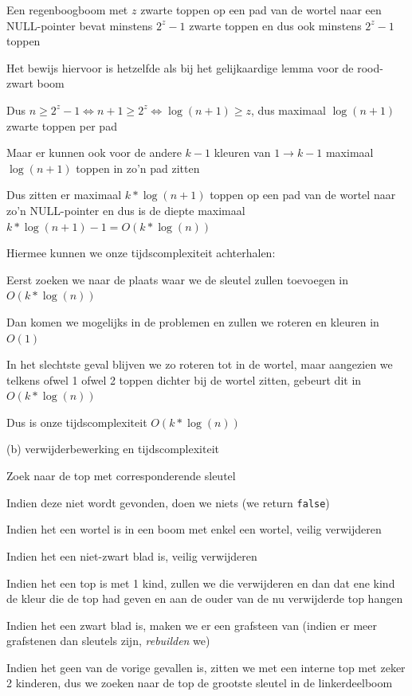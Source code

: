 \documentclass{article}
\def\code#1{\texttt{#1}}
\begin{document}
Een regenboogboom met $z$ zwarte toppen op een pad van de wortel naar een NULL-pointer bevat minstens $2^z - 1$ zwarte toppen en dus ook minstens $2^z - 1$ toppen

Het bewijs hiervoor is hetzelfde als bij het gelijkaardige lemma voor de rood-zwart boom

Dus $n \geq 2^z - 1 \Leftrightarrow n + 1 \geq 2^z \Leftrightarrow \log(n+1) \geq z$, dus maximaal $\log(n+1)$ zwarte toppen per pad

Maar er kunnen ook voor de andere $k - 1$ kleuren van $1 \rightarrow k - 1$ maximaal $\log(n+1)$ toppen in zo'n pad zitten

Dus zitten er maximaal $k * \log(n+1)$ toppen op een pad van de wortel naar zo'n NULL-pointer en dus is de diepte maximaal $k * \log(n+1) - 1 = O(k * \log (n))$

Hiermee kunnen we onze tijdscomplexiteit achterhalen:

Eerst zoeken we naar de plaats waar we de sleutel zullen toevoegen in $O(k * \log(n))$

Dan komen we mogelijks in de problemen en zullen we roteren en kleuren in $O(1)$

In het slechtste geval blijven we zo roteren tot in de wortel, maar aangezien we telkens ofwel 1 ofwel 2 toppen dichter bij de wortel zitten, gebeurt dit in $O(k * \log(n))$

Dus is onze tijdscomplexiteit $O(k * \log(n))$

\newpage

\Large (b) verwijderbewerking en tijdscomplexiteit
\vspace{0.3cm}

\large
Zoek naar de top met corresponderende sleutel

Indien deze niet wordt gevonden, doen we niets (we return \code{false})

Indien het een wortel is in een boom met enkel een wortel, veilig verwijderen

Indien het een niet-zwart blad is, veilig verwijderen

Indien het een top is met 1 kind, zullen we die verwijderen en dan dat ene kind de kleur die de top had geven en aan de ouder van de nu verwijderde top hangen

Indien het een zwart blad is, maken we er een grafsteen van (indien er meer grafstenen dan sleutels zijn, \textit{rebuilden} we)

Indien het geen van de vorige gevallen is, zitten we met een interne top met zeker 2 kinderen, dus we zoeken naar de top de grootste sleutel in de linkerdeelboom
\end{document}

